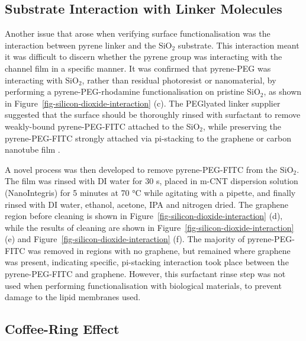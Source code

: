 \documentclass[
  a4paper,
]{scrbook}
\begin{document}
\hypertarget{sec-pyrene-interactions}{%
\subsection{Substrate Interaction with Linker
Molecules}\label{sec-pyrene-interactions}}

Another issue that arose when verifying surface functionalisation was
the interaction between pyrene linker and the SiO\(_2\) substrate. This
interaction meant it was difficult to discern whether the pyrene group
was interacting with the channel film in a specific manner. It was
confirmed that pyrene-PEG was interacting with SiO\(_2\), rather than
residual photoresist or nanomaterial, by performing a
pyrene-PEG-rhodamine functionalisation on pristine SiO\(_2\), as shown
in Figure~\ref{fig-silicon-dioxide-interaction} (c). The PEGlyated
linker supplier suggested that the surface should be thoroughly rinsed
with surfactant to remove weakly-bound pyrene-PEG-FITC attached to the
SiO\(_2\), while preserving the pyrene-PEG-FITC strongly attached via
pi-stacking to the graphene or carbon nanotube film
\autocite{CreativePEGworks2022}.

A novel process was then developed to remove pyrene-PEG-FITC from the
SiO\(_2\). The film was rinsed with DI water for 30 s, placed in m-CNT
dispersion solution (NanoIntegris) for 5 minutes at 70 °C while
agitating with a pipette, and finally rinsed with DI water, ethanol,
acetone, IPA and nitrogen dried. The graphene region before cleaning is
shown in Figure~\ref{fig-silicon-dioxide-interaction} (d), while the
results of cleaning are shown in
Figure~\ref{fig-silicon-dioxide-interaction} (e) and
Figure~\ref{fig-silicon-dioxide-interaction} (f). The majority of
pyrene-PEG-FITC was removed in regions with no graphene, but remained
where graphene was present, indicating specific, pi-stacking interaction
took place between the pyrene-PEG-FITC and graphene. However, this
surfactant rinse step was not used when performing functionalisation
with biological materials, to prevent damage to the lipid membranes
used.

\hypertarget{sec-coffee-ring}{%
\subsection{Coffee-Ring Effect}\label{sec-coffee-ring}}
\end{document}
